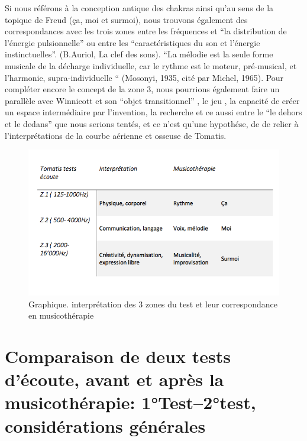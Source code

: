 Si nous référons à la conception antique des chakras ainsi qu'au sens de la
topique de Freud (ça, moi et surmoi), nous trouvons également des correspondances
avec les trois zones entre les
fréquences et ``la distribution de l'énergie pulsionnelle'' ou entre
les 
``caractéristiques du son et l'énergie instinctuelles''. (B.Auriol, La
clef des sons).
``La mélodie est la seule forme musicale de la décharge individuelle, car le rythme est le moteur, pré-musical, et l'harmonie, supra-individuelle `` (Mosonyi, 1935, cité par Michel, 1965).
Pour compléter encore le concept de la zone 3, nous pourrions
également faire un parallèle avec Winnicott et son ``objet
transitionnel'' , le jeu , la capacité de créer un espace
intermédiaire par l'invention, la recherche et ce aussi entre le ``le
dehors et le dedans'' que nous serions tentés, et ce n'est qu'une
hypothése, de de relier à l'interprétations de la courbe aérienne et osseuse de Tomatis. 
 

\begin{figure}
	\centering
	\includegraphics[width=0.7\linewidth]{images/testinterpmusico}
	\caption[ L'interprétation des 3 zones et leur correspondance
        en musicothérapie]{Graphique. interprétation des 3 zones du
          test et leur correspondance en musicothérapie}
       
	\label{graphiquecolonnetestmusico}
      \end{figure}











      


  

\section{Comparaison de deux tests d'écoute, avant et après la musicothérapie: 1°Test--2°test, considérations générales}
	
